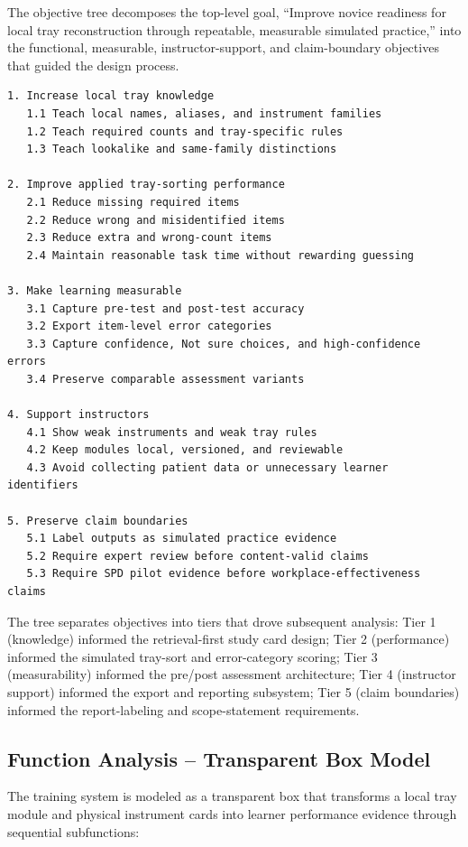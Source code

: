 \documentclass[10pt,a4paper]{article}
\begin{document}
The objective tree decomposes the top-level goal, ``Improve novice readiness for
local tray reconstruction through repeatable, measurable simulated practice,''
into the functional, measurable, instructor-support, and claim-boundary
objectives that guided the design process.

\begin{lstlisting}
1. Increase local tray knowledge
   1.1 Teach local names, aliases, and instrument families
   1.2 Teach required counts and tray-specific rules
   1.3 Teach lookalike and same-family distinctions

2. Improve applied tray-sorting performance
   2.1 Reduce missing required items
   2.2 Reduce wrong and misidentified items
   2.3 Reduce extra and wrong-count items
   2.4 Maintain reasonable task time without rewarding guessing

3. Make learning measurable
   3.1 Capture pre-test and post-test accuracy
   3.2 Export item-level error categories
   3.3 Capture confidence, Not sure choices, and high-confidence errors
   3.4 Preserve comparable assessment variants

4. Support instructors
   4.1 Show weak instruments and weak tray rules
   4.2 Keep modules local, versioned, and reviewable
   4.3 Avoid collecting patient data or unnecessary learner identifiers

5. Preserve claim boundaries
   5.1 Label outputs as simulated practice evidence
   5.2 Require expert review before content-valid claims
   5.3 Require SPD pilot evidence before workplace-effectiveness claims
\end{lstlisting}

The tree separates objectives into tiers that drove subsequent analysis: Tier 1
(knowledge) informed the retrieval-first study card design; Tier 2 (performance)
informed the simulated tray-sort and error-category scoring; Tier 3
(measurability) informed the pre/post assessment architecture; Tier 4 (instructor
support) informed the export and reporting subsystem; Tier 5 (claim boundaries)
informed the report-labeling and scope-statement requirements.

\subsection{Function Analysis -- Transparent Box Model}
\label{sec:function-analysis-transparent-box-model}

The training system is modeled as a transparent box that transforms a local tray
module and physical instrument cards into learner performance evidence through
sequential subfunctions:
\end{document}
